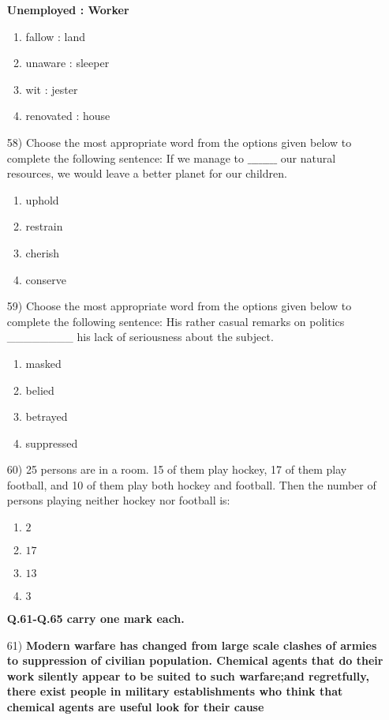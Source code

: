 \documentclass[journal]{IEEEtran}
\begin{document}
\begin{enumerate}
\textbf{Unemployed : Worker}
\begin{enumerate}
    \item fallow : land
    \item unaware : sleeper
    \item wit : jester
    \item renovated : house
\end{enumerate}
\item[58)] Choose the most appropriate word from the options given below to complete the following sentence:  
If we manage to $\_\_\_\_\_\_\_\_$ our natural resources, we would leave a better planet for our children.
\begin{multicols}{2}
\begin{enumerate}
    \item uphold
    \item restrain
    \item cherish
    \item conserve
\end{enumerate}
\end{multicols}
\item[59)] Choose the most appropriate word from the options given below to complete the following sentence:  
His rather casual remarks on politics \_\_\_\_\_\_\_\_ his lack of seriousness about the subject.
\begin{multicols}{2}
\begin{enumerate}
   \item masked
    \item belied
    \item betrayed
    \item suppressed
\end{enumerate}    
\end{multicols}
\item[60)] 25 persons are in a room. 15 of them play hockey, 17 of them play football, and 10 of them play both hockey and football. Then the number of persons playing neither hockey nor football is:
\begin{multicols}{2}
\begin{enumerate}
    \item $2$
    \item $17$
    \item $13$
    \item $3$
\end{enumerate}    
\end{multicols}
\bigskip
\textbf{Q.61-Q.65 carry one mark each.}
\bigskip
\item[61)] \textbf{Modern warfare has changed from large scale clashes of armies to suppression of civilian population. Chemical agents that do their work silently appear to be suited to such warfare;and regretfully, there exist people in military establishments who think that chemical agents are useful look for their cause}

\end{enumerate}
\end{document}
